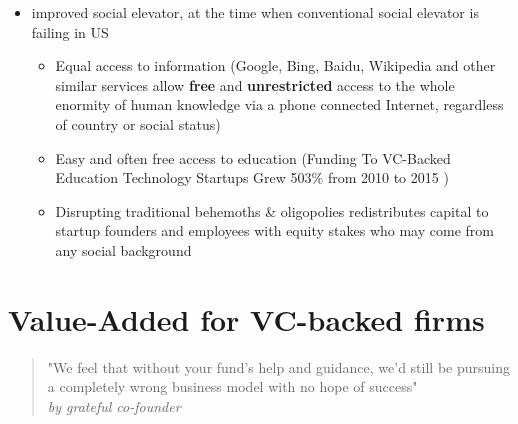 \begin{itemize}
\begin{itemize}
        \end{itemize}
        \item improved social elevator, at the time when conventional social elevator is failing in US \parencite{elevator:2010}
        \begin{itemize}
            \item Equal access to information (Google, Bing, Baidu, Wikipedia and other similar services allow \textbf{free} and \textbf{unrestricted} access to the whole enormity of human knowledge via a phone connected Internet, regardless of country or social status)
            \item Easy and often free access to education (Funding To VC-Backed Education Technology Startups Grew 503\% from 2010 to 2015 \parencite{edtech:2015} )
            \item Disrupting traditional behemoths \& oligopolies redistributes capital to startup founders and employees with equity stakes who may come from any social background
        \end{itemize}
    \end{itemize}
    
    

\section{Value-Added for VC-backed firms}

\begin{quote} 
    \centering 
        "We feel that without your fund's help and guidance, we'd still be pursuing a completely wrong business model with no hope of success"\\
    \raggedleft
        \emph{by grateful co-founder}
\end{quote}

